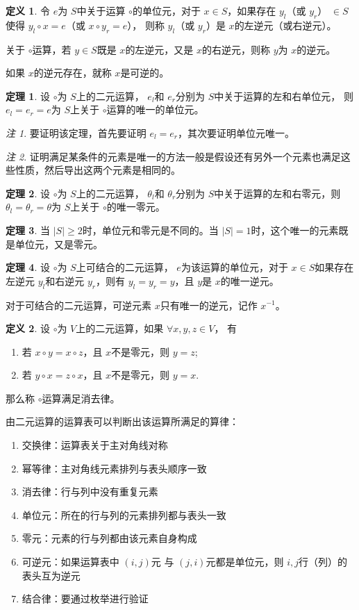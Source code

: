 \documentclass[a4paper,11pt]{article}%
\theoremstyle{remark}
\newtheorem*{remark}{注}
\theoremstyle{remark}
\theoremstyle{definition}
\newtheorem{theorem}{定理}[section]
\theoremstyle{definition}
\newtheorem*{definition}{定义}
\theoremstyle{plain}
\newcommand*{\abs}[1]{\lvert #1 \rvert}
\begin{document}
\begin{definition}
    令 $e$为 $S$中关于运算 $\circ$的单位元，对于 $x\in S$，如果存在 $y_l$（或 $y_r$） $\in S$使得  $y_l\circ x=e$（或 $x\circ y_r=e$）， 
    则称 $y_l$（或 $y_r$）是 $x$的左逆元（或右逆元）。

    关于 $\circ$运算，若 $y\in S$既是 $x$的左逆元，又是 $x$的右逆元，则称 $y$为 $x$的逆元。 

    如果 $x$的逆元存在，就称 $x$是可逆的。
\end{definition}
\begin{theorem}
    设 $\circ$为 $S$上的二元运算，  $e_l$和 $e_r$分别为 $S$中关于运算的左和右单位元， 则 $e_l=e_r=e$为 $S$上关于 $\circ$运算的唯一的单位元。
\end{theorem}
\begin{remark}
    要证明该定理，首先要证明 $e_l=e_r$，其次要证明单位元唯一。
\end{remark}
\begin{remark}
    证明满足某条件的元素是唯一的方法一般是假设还有另外一个元素也满足这些性质，然后导出这两个元素是相同的。
\end{remark}
\begin{theorem}
    设 $\circ$为 $S$上的二元运算， $\theta_l$和 $\theta_r$分别为 $S$中关于运算的左和右零元，则 $\theta_l=\theta_r=\theta$为 $S$上关于 $\circ$的唯一零元。
\end{theorem}
\begin{theorem}
    当 $\abs{S}\geq 2$时，单位元和零元是不同的。当 $\abs{S}=1$时，这个唯一的元素既是单位元，又是零元。
\end{theorem}
\begin{theorem}
    设 $\circ$为 $S$上可结合的二元运算， $e$为该运算的单位元，对于 $x\in S$如果存在左逆元 $y_l$和右逆元 $y_r$，则有 $y_l=y_r=y$，且 $y$是 $x$的唯一逆元。
\end{theorem}
对于可结合的二元运算，可逆元素 $x$只有唯一的逆元，记作 $x^{-1}$。
\begin{definition}
    设 $\circ$为 $V$上的二元运算，如果 $\forall x,y,z\in V$， 有 
    \begin{enumerate}
        \item 若 $x\circ y=x\circ z$，且 $x$不是零元，则 $y=z$;
        \item 若 $y\circ x=z\circ x$，且 $x$不是零元，则 $y=x$.
    \end{enumerate}
    那么称 $\circ$运算满足消去律。
\end{definition}
由二元运算的运算表可以判断出该运算所满足的算律：
\begin{enumerate}
    \item 交换律：运算表关于主对角线对称
    \item 幂等律：主对角线元素排列与表头顺序一致
    \item 消去律：行与列中没有重复元素
    \item 单位元：所在的行与列的元素排列都与表头一致
    \item 零元：元素的行与列都由该元素自身构成
    \item 可逆元：如果运算表中 $(i,j)$元 与 $(j,i)$元都是单位元，则 $i,j$行（列）的表头互为逆元
    \item 结合律：要通过枚举进行验证
\end{enumerate}
\end{document}
